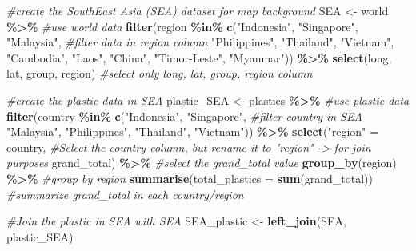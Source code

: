 \documentclass[
]{article}
\newenvironment{Shaded}{\begin{snugshade}}{\end{snugshade}}
\newcommand{\AttributeTok}[1]{\textcolor[rgb]{0.13,0.29,0.53}{#1}}
\newcommand{\CommentTok}[1]{\textcolor[rgb]{0.56,0.35,0.01}{\textit{#1}}}
\newcommand{\FunctionTok}[1]{\textcolor[rgb]{0.13,0.29,0.53}{\textbf{#1}}}
\newcommand{\NormalTok}[1]{#1}
\newcommand{\OtherTok}[1]{\textcolor[rgb]{0.56,0.35,0.01}{#1}}
\newcommand{\SpecialCharTok}[1]{\textcolor[rgb]{0.81,0.36,0.00}{\textbf{#1}}}
\newcommand{\StringTok}[1]{\textcolor[rgb]{0.31,0.60,0.02}{#1}}
\begin{document}
\begin{Shaded}
\begin{Highlighting}[]
\CommentTok{\#create the SouthEast Asia (SEA) dataset for map background}
\NormalTok{SEA }\OtherTok{\textless{}{-}}\NormalTok{ world }\SpecialCharTok{\%\textgreater{}\%}                                                    \CommentTok{\#use world data}
  \FunctionTok{filter}\NormalTok{(region }\SpecialCharTok{\%in\%} \FunctionTok{c}\NormalTok{(}\StringTok{"Indonesia"}\NormalTok{, }\StringTok{"Singapore"}\NormalTok{, }\StringTok{"Malaysia"}\NormalTok{,        }\CommentTok{\#filter data in region column}
                       \StringTok{"Philippines"}\NormalTok{, }\StringTok{"Thailand"}\NormalTok{, }\StringTok{"Vietnam"}\NormalTok{, }
                       \StringTok{"Cambodia"}\NormalTok{, }\StringTok{"Laos"}\NormalTok{, }\StringTok{"China"}\NormalTok{, }\StringTok{"Timor{-}Leste"}\NormalTok{, }
                       \StringTok{"Myanmar"}\NormalTok{)) }\SpecialCharTok{\%\textgreater{}\%}
  \FunctionTok{select}\NormalTok{(long, lat, group, region)                          }\CommentTok{\#select only long, lat, group, region column}


\CommentTok{\#create the plastic data in SEA}
\NormalTok{plastic\_SEA }\OtherTok{\textless{}{-}}\NormalTok{ plastics }\SpecialCharTok{\%\textgreater{}\%}                          \CommentTok{\#use plastic data}
  \FunctionTok{filter}\NormalTok{(country }\SpecialCharTok{\%in\%} \FunctionTok{c}\NormalTok{(}\StringTok{"Indonesia"}\NormalTok{, }\StringTok{"Singapore"}\NormalTok{,    }\CommentTok{\#filter country in SEA}
                        \StringTok{"Malaysia"}\NormalTok{, }\StringTok{"Philippines"}\NormalTok{, }
                        \StringTok{"Thailand"}\NormalTok{, }\StringTok{"Vietnam"}\NormalTok{)) }\SpecialCharTok{\%\textgreater{}\%}          
  \FunctionTok{select}\NormalTok{(}\StringTok{"region"} \OtherTok{=}\NormalTok{ country,  }\CommentTok{\#Select the country column, but rename it to "region" {-}\textgreater{} for join purposes}
\NormalTok{         grand\_total) }\SpecialCharTok{\%\textgreater{}\%}     \CommentTok{\#select the grand\_total value    }
  \FunctionTok{group\_by}\NormalTok{(region)  }\SpecialCharTok{\%\textgreater{}\%}       \CommentTok{\#group by region}
  \FunctionTok{summarise}\NormalTok{(}\AttributeTok{total\_plastics =} \FunctionTok{sum}\NormalTok{(grand\_total))  }\CommentTok{\#summarize grand\_total in each country/region}

\CommentTok{\#Join the plastic in SEA with SEA}
\NormalTok{SEA\_plastic }\OtherTok{\textless{}{-}} \FunctionTok{left\_join}\NormalTok{(SEA, plastic\_SEA)}


\end{Highlighting}
\end{Shaded}
\end{document}
